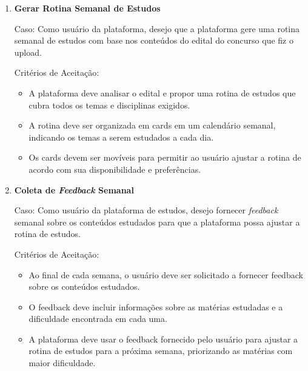 \begin{enumerate}[label=\textbf{\arabic*.}]
    \item \textbf{Gerar Rotina Semanal de Estudos} \newline

    Caso: Como usuário da plataforma, desejo que a plataforma gere uma rotina semanal de estudos com base nos conteúdos do edital do concurso que fiz o upload.

   Critérios de Aceitação:
   \begin{itemize}
       \item A plataforma deve analisar o edital e propor uma rotina de estudos que cubra todos os temas e disciplinas exigidos.
       \item A rotina deve ser organizada em cards em um calendário semanal, indicando os temas a serem estudados a cada dia.
       \item Os cards devem ser movíveis para permitir ao usuário ajustar a rotina de acordo com sua disponibilidade e preferências.
   \end{itemize}

   \item \textbf{Coleta de \textit{Feedback} Semanal} \newline

   Caso: Como usuário da plataforma de estudos, desejo fornecer \textit{feedback} semanal sobre os conteúdos estudados para que a plataforma possa ajustar a rotina de estudos.

   Critérios de Aceitação:
   \begin{itemize}
       \item Ao final de cada semana, o usuário deve ser solicitado a fornecer feedback sobre os conteúdos estudados.
       \item O feedback deve incluir informações sobre as matérias estudadas e a dificuldade encontrada em cada uma.
       \item A plataforma deve usar o feedback fornecido pelo usuário para ajustar a rotina de estudos para a próxima semana, priorizando as matérias com maior dificuldade.
   \end{itemize}
    
\end{enumerate}
